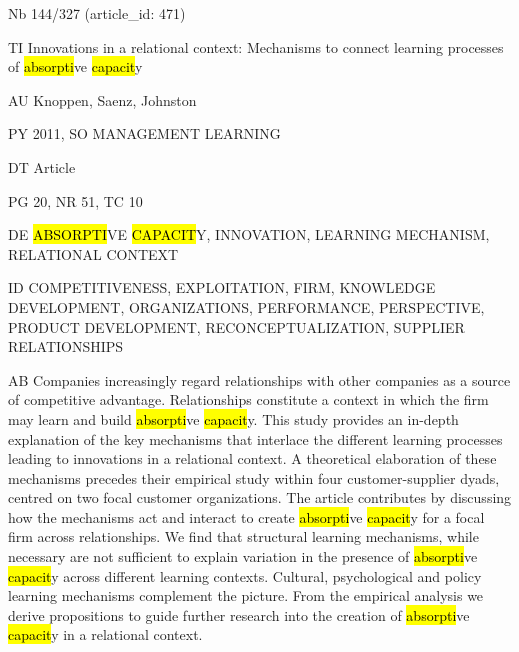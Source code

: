 \documentclass[a4paper]{article}
\begin{document}
\vspace*{-2cm}
Nb \tabto{0cm}144/327 (article\_id: 471)\par
TI \tabto{0cm}Innovations in a relational context: Mechanisms to connect learning processes of \hl{absorpti}ve \hl{capacit}y\par
AU \tabto{0cm}Knoppen, Saenz, Johnston\par
PY \tabto{0cm}2011, SO MANAGEMENT LEARNING\par
DT \tabto{0cm}Article\par
PG \tabto{0cm}20, NR 51, TC 10\par
DE \tabto{0cm}\hl{ABSORPTI}VE \hl{CAPACIT}Y, INNOVATION, LEARNING MECHANISM, RELATIONAL CONTEXT\par
ID \tabto{0cm}COMPETITIVENESS, EXPLOITATION, FIRM, KNOWLEDGE DEVELOPMENT, ORGANIZATIONS, PERFORMANCE, PERSPECTIVE, PRODUCT DEVELOPMENT, RECONCEPTUALIZATION, SUPPLIER RELATIONSHIPS\par
AB \tabto{0cm}Companies increasingly regard relationships with other companies as a source of competitive advantage. Relationships constitute a context in which the firm may learn and build \hl{absorpti}ve \hl{capacit}y. This study provides an in-depth explanation of the key mechanisms that interlace the different learning processes leading to innovations in a relational context. A theoretical elaboration of these mechanisms precedes their empirical study within four customer-supplier dyads, centred on two focal customer organizations. The article contributes by discussing how the mechanisms act and interact to create \hl{absorpti}ve \hl{capacit}y for a focal firm across relationships. We find that structural learning mechanisms, while necessary are not sufficient to explain variation in the presence of \hl{absorpti}ve \hl{capacit}y across different learning contexts. Cultural, psychological and policy learning mechanisms complement the picture. From the empirical analysis we derive propositions to guide further research into the creation of \hl{absorpti}ve \hl{capacit}y in a relational context.\par
\clearpage
\end{document}
